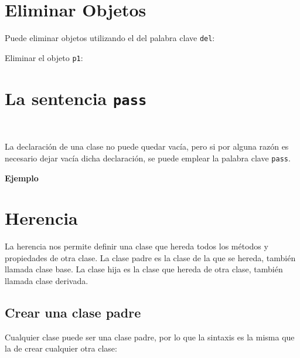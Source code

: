 \section{Eliminar Objetos}

Puede eliminar objetos utilizando el del palabra clave \texttt{del}:

\begin{code}
Eliminar el objeto \texttt{p1}:

\begin{Shaded}
\begin{Highlighting}[]
\end{Highlighting}
\end{Shaded}
\end{code}

\section{\texorpdfstring{La sentencia \texttt{pass}}{La sentencia pass}}\

La declaración de una clase no puede quedar vacía, pero si por alguna
razón es necesario dejar vacía dicha declaración, se puede emplear la
palabra clave \texttt{pass}.

\textbf{Ejemplo}

\begin{Shaded}
\begin{Highlighting}[]
\end{Highlighting}
\end{Shaded}

\section{Herencia}

La herencia nos permite definir una clase que hereda todos los métodos y
propiedades de otra clase. La clase padre es la clase de la que se
hereda, también llamada clase base. La clase hija es la clase que hereda
de otra clase, también llamada clase derivada.

\subsection{Crear una clase padre}

Cualquier clase puede ser una clase padre, por lo que la sintaxis es la
misma que la de crear cualquier otra clase:\\


